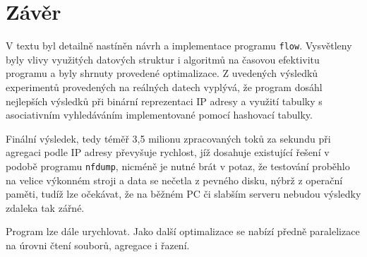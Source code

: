 \documentclass[12pt,a4paper,titlepage,final]{article}
\begin{document}
\section{Závěr}
V textu byl detailně nastíněn návrh a implementace programu \texttt{flow}. Vysvětleny byly vlivy využitých datových struktur i algoritmů na časovou efektivitu programu a byly shrnuty provedené optimalizace. Z uvedených výsledků experimentů provedených na reálných datech vyplývá, že program dosáhl nejlepších výsledků při binární reprezentaci IP adresy a využití tabulky s asociativním vyhledáváním implementované pomocí hashovací tabulky.

Finální výsledek, tedy téměř 3,5 milionu zpracovaných toků za sekundu při agregaci podle IP adresy převyšuje rychlost, jíž dosahuje existující řešení v podobě programu \texttt{nfdump}, nicméně je nutné brát v potaz, že testování proběhlo na velice výkonném stroji a data se nečetla z pevného disku, nýbrž z operační paměti, tudíž lze očekávat, že na běžném PC či slabším serveru nebudou výsledky zdaleka tak zářné.

Program lze dále urychlovat. Jako další optimalizace se nabízí předně paralelizace na úrovni čtení souborů, agregace i řazení.




\end{document}
